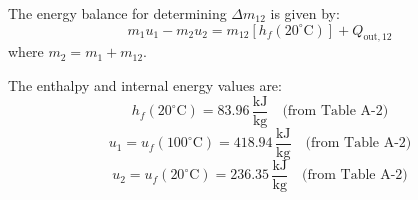 The energy balance for determining \( \Delta m_{12} \) is given by:  
\[
m_1 u_1 - m_2 u_2 = m_{12} \left[ h_f(20^\circ\text{C}) \right] + Q_{\text{out},12}
\]  
where \( m_2 = m_1 + m_{12} \).  

The enthalpy and internal energy values are:  
\[
h_f(20^\circ\text{C}) = 83.96 \, \frac{\text{kJ}}{\text{kg}} \quad \text{(from Table A-2)}
\]  
\[
u_1 = u_f(100^\circ\text{C}) = 418.94 \, \frac{\text{kJ}}{\text{kg}} \quad \text{(from Table A-2)}
\]  
\[
u_2 = u_f(20^\circ\text{C}) = 236.35 \, \frac{\text{kJ}}{\text{kg}} \quad \text{(from Table A-2)}
\]